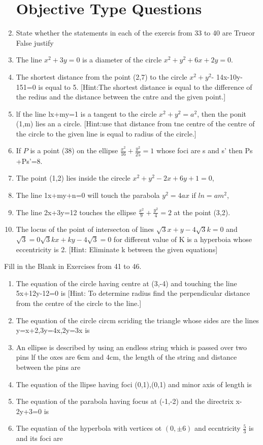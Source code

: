 \documentclass[12pt]{article}
\begin{document}
\begin{enumerate}
\section*{Objective Type Questions }
\item State whether the statements in each of the exercis from 33 to 40 are Trueor False justify
\item The line $x^2+3y=0$ is a diameter of the circle $x^2+y^2+6x+2y=0$.
\item The shortest distance from the point (2,7) to the circle $x^2+y^2$- 14x-10y-151=0 is equal to 5.
[Hint:The shortest distance is equal to the difference of the redius and the distance between  the  cntre and the given point.]
\item lf the line lx+my=1 is a tangent to the circle $x^2+y^2=a^2$, then the ponit (1,m) lies an a circle.
[Hint:use that distance from tne centre of the centre of the circle to the given line is equal to radius of the circle.]
\item If ${P}$ is a point (38) on the ellipse $\frac{x^2}{16}+\frac{y^2}{25}=1$ whose foci  are s and s' then Ps +Ps'=8.
\item The point (1,2) lies inside the cirecle $x^2+y^2-2x+6y+1=0$,
\item The line 1x+my+n=0 will touch the parabola $y^2=4 ax$ if $ln =am^2$,
\item The line 2x+3y=12 touches the ellipse $\frac{x^2}{9}+\frac{y^2}{4}=2$ at the point (3,2).
\item The locus of the point of intersecton of lines $\sqrt{3}x+y-4\sqrt{3}k=0$ and $\sqrt{3}=0\sqrt{3}kx+ky-4\sqrt{3}=0$ for different value of K is a hyperboia whose eccentricity is 2.
[Hint: Eliminate k between the given equations]
\end{enumerate}
Fill in the Blank in Exercises from 41 to 46.
\begin{enumerate}[resume]
\item The equation of the circle having centre at (3,-4) and touching the line 5x+12y-12=0 is \makebox[1cm]{\hrulefill}                     
[Hint: To determine radius find the perpendicular distance  from the centre of the circle to the line.]
\item The equation of the circle circm scriding the triangle whose sides are the lines y=x+2,3y=4x,2y=3x is  \makebox[1cm]{\hrulefill}         
\item An ellipse is described by using an endless string which is passed over two pins lf the oxes are 6cm and 4cm, the length of the string and distance between the pins are  \makebox[1cm]{\hrulefill}             
\item The equation of the llipse having foci (0,1),(0,1) and minor axis of length is \makebox[1cm]{\hrulefill}                
\item The equation of the parabola having focus at (-1,-2) and the directrix x-2y+3=0 is \makebox[1cm]{\hrulefill}   
\item The equatian of the hyperbola with vertices ot $(0,\pm6)$ and eccntricity $\frac{5}{3}$ is and its foci are \makebox[1cm]{\hrulefill}
\end{enumerate}        
\end{document}
